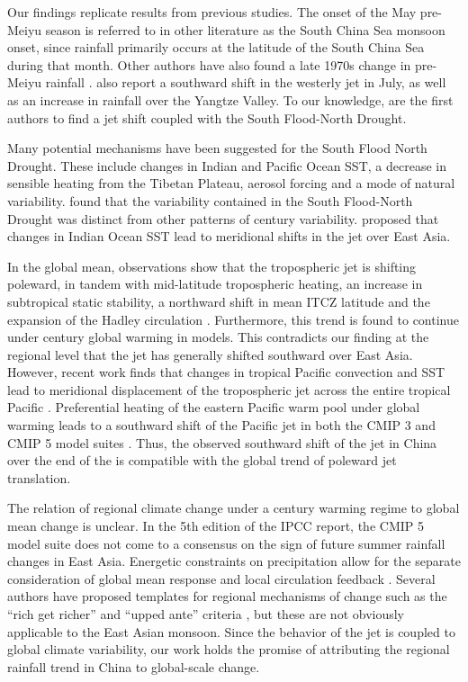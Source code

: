 \documentclass[draft,grl]{AGUTeX}
\begin{document}
\begin{article}
	Our findings replicate results from previous studies. The onset of the May pre-Meiyu season is referred to in other literature as the South China Sea monsoon onset, since rainfall primarily occurs at the latitude of the South China Sea during that month. Other authors have also found a late 1970s change in pre-Meiyu rainfall \citep{Wang2009}. \citet{Xuan2011} also report a southward shift in the westerly jet in July, as well as an increase in rainfall over the Yangtze Valley.	To our knowledge, \citet{Yu2004} are the first authors to find a jet shift coupled with the South Flood-North Drought. 

Many potential mechanisms have been suggested for the South Flood North Drought. These include changes in Indian and Pacific Ocean SST,  a decrease in sensible heating from the Tibetan Plateau, aerosol forcing and a mode of natural variability. \cite{Zhou2009} found that the variability contained in the South Flood-North Drought was distinct from other patterns of  century variability. \citet{Qu2012} proposed that changes in Indian Ocean SST lead to meridional shifts in the jet over East Asia.

In the global mean, observations show that the tropospheric jet is shifting poleward, in tandem with mid-latitude tropospheric heating, an increase in subtropical static stability, a northward shift in mean ITCZ latitude and the expansion of the Hadley circulation \citep{Fu2006,Archer2008}. Furthermore, this trend is found to continue under  century global warming in models\citep{Lu2007,Kang2012}. This contradicts our finding at the regional level that the jet has generally shifted southward over East Asia. However, recent work finds that changes in tropical Pacific convection and SST lead to meridional displacement of the tropospheric jet across the entire tropical Pacific \citep{Park2014a}. Preferential heating of the eastern Pacific warm pool under global warming leads to a southward shift of the Pacific jet in both the CMIP 3 and CMIP 5 model suites \citep{Park2014}. Thus, the observed southward shift of the jet in China over the end of the  is compatible with the global trend of poleward jet translation.

The relation of regional climate change under a  century warming regime to global mean change is unclear. In the 5th edition of the IPCC report, the CMIP 5 model suite does not come to a consensus on the sign of future summer rainfall changes in East Asia\citep{Christensen2011}. Energetic constraints on precipitation allow for the separate consideration of global mean response and local circulation feedback \citep{Muller2011}. Several authors have proposed templates for regional mechanisms of change such as the ``rich get richer'' and ``upped ante'' criteria \citep{Held2006,Lintner2007,Chou2009}, but these are not obviously applicable to the East Asian monsoon. Since the behavior of the jet is coupled to global climate variability, our work holds the promise of attributing the regional rainfall trend in China to global-scale change.



\end{article}
\end{document}
